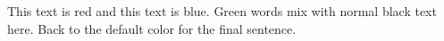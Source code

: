 \documentclass{article}
\begin{document}
{\Red This text is red} and {\Blue this text is blue}.
{\Green Green words} mix with normal black text here.
Back to the default color for the final sentence.
\end{document}
